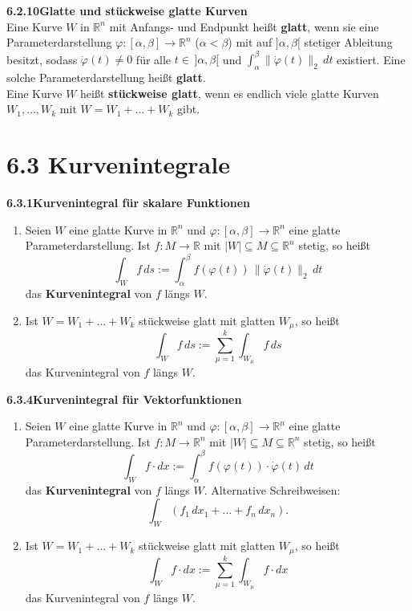 \documentclass[a4paper,12pt]{article}
\newcommand{\gentry}[3]{%
  \noindent\textbf{#1\quad #2}\nopagebreak\\[0.2em]
  #3\par\smallskip
}
\begin{document}
\gentry{6.2.10}{Glatte und stückweise glatte Kurven}{%
  Eine Kurve $W$ in $\mathbb{R}^n$ mit Anfangs- und Endpunkt heißt \textbf{glatt}, wenn sie
  eine Parameterdarstellung $\varphi : [\alpha, \beta] \longrightarrow \mathbb{R}^n$
  ($\alpha < \beta$) mit auf $]\alpha, \beta[$ stetiger Ableitung besitzt, sodass
  $\dot{\varphi}(t) \neq 0$ für alle $t \in\, ]\alpha, \beta[$ und
  $\int_\alpha^\beta \|\dot{\varphi}(t)\|_2\,dt$ existiert. Eine solche Parameterdarstellung
  heißt \textbf{glatt}.\\
  Eine Kurve $W$ heißt \textbf{stückweise glatt}, wenn es endlich viele glatte Kurven
  $W_1, \ldots, W_k$ mit $W = W_1 + \ldots + W_k$ gibt.
}

\section*{6.3 \quad Kurvenintegrale}

\gentry{6.3.1}{Kurvenintegral für skalare Funktionen}{%
  \begin{enumerate}[label=(\roman*),topsep=2pt,itemsep=2pt]
    \item Seien $W$ eine glatte Kurve in $\mathbb{R}^n$ und
          $\varphi : [\alpha, \beta] \longrightarrow \mathbb{R}^n$ eine glatte
          Parameterdarstellung. Ist $f : M \longrightarrow \mathbb{R}$ mit
          $|W| \subseteq M \subseteq \mathbb{R}^n$ stetig, so heißt
          \[
            \int_W f\, ds := \int_\alpha^\beta f(\varphi(t))\, \|\dot{\varphi}(t)\|_2\, dt
          \]
          das \textbf{Kurvenintegral} von $f$ längs $W$.
    \item Ist $W = W_1 + \ldots + W_k$ stückweise glatt mit glatten $W_\mu$, so heißt
          \[
            \int_W f\, ds := \sum_{\mu=1}^{k} \int_{W_\mu} f\, ds
          \]
          das Kurvenintegral von $f$ längs $W$.
  \end{enumerate}
}

\gentry{6.3.4}{Kurvenintegral für Vektorfunktionen}{%
  \begin{enumerate}[label=(\roman*),topsep=2pt,itemsep=2pt]
    \item Seien $W$ eine glatte Kurve in $\mathbb{R}^n$ und
          $\varphi : [\alpha, \beta] \longrightarrow \mathbb{R}^n$ eine glatte
          Parameterdarstellung. Ist $f : M \longrightarrow \mathbb{R}^n$ mit
          $|W| \subseteq M \subseteq \mathbb{R}^n$ stetig, so heißt
          \[
            \int_W f \cdot dx := \int_\alpha^\beta f(\varphi(t)) \cdot \dot{\varphi}(t)\, dt
          \]
          das \textbf{Kurvenintegral} von $f$ längs $W$. Alternative Schreibweisen:
          \[
            \int_W (f_1\, dx_1 + \ldots + f_n\, dx_n).
          \]
    \item Ist $W = W_1 + \ldots + W_k$ stückweise glatt mit glatten $W_\mu$, so heißt
          \[
            \int_W f \cdot dx := \sum_{\mu=1}^{k} \int_{W_\mu} f \cdot dx
          \]
          das Kurvenintegral von $f$ längs $W$.
  \end{enumerate}
}
\end{document}
